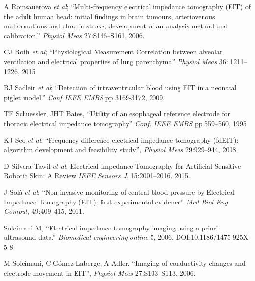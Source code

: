 \documentclass[12pt]{article} \usepackage[margin=3cm]{geometry} \usepackage[margin=20pt,font=small,labelfont=bf]{caption}\def\TBLWIDA{35mm}\def\TBLWIDB{95mm}
\newcommand{\ifmaxthree}[2]{#2 {\em et al}; }
\begin{document}
\begin{thebibliography}{00}
\ifmaxthree{
A Romsauerova, A McEwan, L Horesh, R Yerworth, RH Bayford, DS Holder
}{
A Romsauerova
}
``Multi-frequency electrical impedance tomography (EIT) of the adult human head: initial findings in brain tumours, arteriovenous malformations and chronic stroke, development of an analysis method and calibration.''
{\em Physiol Meas} 27:S146--S161, 2006. %

\ifmaxthree{
CJ Roth, A Ehrl, T Becher, I Frerichs, JC Schittny, N Weiler, WA Wall, 
}{
CJ Roth
}
``Physiological Measurement
Correlation between alveolar ventilation and 
electrical properties of lung parenchyma''
{\em Physiol Meas} 36: 1211--1226, 2015

\ifmaxthree{
RJ Sadleir, T Tang, AS Tucker, P Borum, M Weiss
}{
RJ Sadleir
}
``Detection of intraventricular blood using EIT in a neonatal piglet model.''
{\em Conf IEEE EMBS} pp 3169-3172, 2009.

TF Schuessler, JHT Bates, 
``Utility of an esophageal reference electrode for thoracic electrical impedance tomography''
{\em Conf. IEEE EMBS} pp 559--560, 1995

\ifmaxthree{
JK Seo, J Lee, SW Kim, H Zribi, EJe Woo;
}{
KJ Seo
}
``Frequency-difference electrical impedance tomography (fdEIT): algorithm development and feasibility study'',
{\em  Physiol Meas} 29:929--944, 2008.


\ifmaxthree{
David Silvera-Tawil ; David Rye ; Manuchehr Soleimani ; Mari Velonaki
}{
D Silvera-Tawil
}
Electrical Impedance Tomography for Artificial Sensitive Robotic Skin: A Review
{\em IEEE Sensors J}, 15:2001--2016, 2015.

\ifmaxthree{
J Solà, A Adler, A Santos, G Tusman, FS Sipmann, SH Böhm,
}{
J Solà
}
``Non-invasive monitoring of central blood pressure by Electrical Impedance
Tomography (EIT): first experimental evidence''
{\em Med Biol Eng Comput}, 49:409--415, 2011.

Soleimani M, ``Electrical impedance tomography imaging using a priori ultrasound data.''
{\em Biomedical engineering online} 5, 2006. %
DOI:10.1186/1475-925X-5-8

M Soleimani, C Gómez-Laberge, A Adler.
``Imaging of conductivity changes and electrode movement in EIT'',
{\em Physiol Meas} 27:S103--S113, 2006.


\end{thebibliography}
\end{document}
